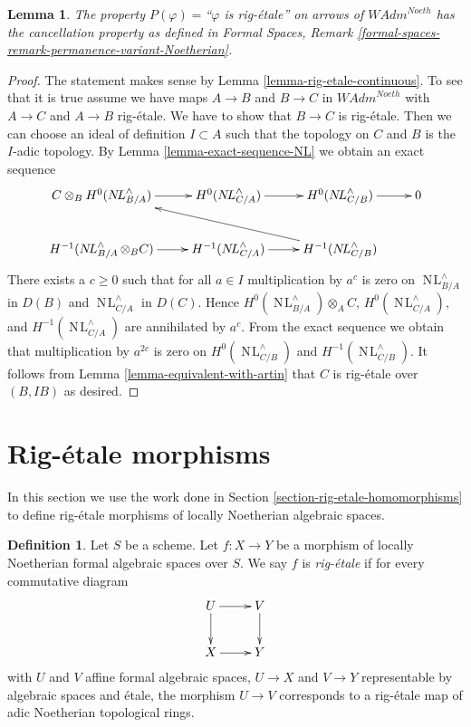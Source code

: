 \documentclass{stacks-project}
\theoremstyle{plain}
\newtheorem{lemma}[subsection]{Lemma}
\theoremstyle{definition}
\newtheorem{definition}[subsection]{Definition}
\theoremstyle{remark}
\numberwithin{equation}{subsection}
\def\NL{\mathop{N\!L}\nolimits}
\begin{document}
\begin{lemma}
\label{lemma-permanence-rig-etale-continuous}
The property $P(\varphi)=$``$\varphi$ is rig-\'etale''
on arrows of $\textit{WAdm}^{Noeth}$ has the cancellation property
as defined in Formal Spaces, Remark
\ref{formal-spaces-remark-permanence-variant-Noetherian}.
\end{lemma}

\begin{proof}
The statement makes sense by
Lemma \ref{lemma-rig-etale-continuous}.
To see that it is true assume we have maps
$A \to B$ and $B \to C$ in $\textit{WAdm}^{Noeth}$
with $A \to C$ and $A \to B$ rig-\'etale.
We have to show that $B \to C$ is rig-\'etale.
Then we can choose an ideal of definition $I \subset A$
such that the topology on $C$ and $B$ is the $I$-adic topology.
By Lemma \ref{lemma-exact-sequence-NL} we obtain an exact sequence
$$
\xymatrix{
C \otimes_B H^0(\NL_{B/A}^\wedge) \ar[r] &
H^0(\NL_{C/A}^\wedge) \ar[r] &
H^0(\NL_{C/B}^\wedge) \ar[r] & 0 \\
H^{-1}(\NL_{B/A}^\wedge \otimes_B C) \ar[r] &
H^{-1}(\NL_{C/A}^\wedge) \ar[r] &
H^{-1}(\NL_{C/B}^\wedge) \ar[llu]
}
$$
There exists a $c \geq 0$ such that for all $a \in I$ 
multiplication by $a^c$ is zero on $\NL_{B/A}^\wedge$ in $D(B)$ and
$\NL_{C/A}^\wedge$ in $D(C)$. Hence
$H^0(\NL_{B/A}^\wedge) \otimes_A C$,
$H^0(\NL_{C/A}^\wedge)$, and
$H^{-1}(\NL_{C/A}^\wedge)$
are annihilated by $a^c$. From the exact sequence
we obtain that multiplication by $a^{2c}$ is zero on
$H^0(\NL_{C/B}^\wedge)$ and $H^{-1}(\NL_{C/B}^\wedge)$.
It follows from Lemma \ref{lemma-equivalent-with-artin}
that $C$ is rig-\'etale over $(B, IB)$ as desired.
\end{proof}














\section{Rig-\'etale morphisms}
\label{section-rig-etale-morphisms}

\noindent
In this section we use the work done in
Section \ref{section-rig-etale-homomorphisms}
to define rig-\'etale morphisms of locally Noetherian algebraic spaces.

\begin{definition}
\label{definition-rig-etale}
Let $S$ be a scheme. Let $f : X \to Y$ be a morphism of locally
Noetherian formal algebraic spaces over $S$. We say $f$ is
{\it rig-\'etale} if for every commutative diagram
$$
\xymatrix{
U \ar[d] \ar[r] & V \ar[d] \\
X \ar[r] & Y
}
$$
with $U$ and $V$ affine formal algebraic spaces, $U \to X$ and $V \to Y$
representable by algebraic spaces and \'etale, the morphism $U \to V$
corresponds to a rig-\'etale map of adic Noetherian topological rings.
\end{definition}
\end{document}
